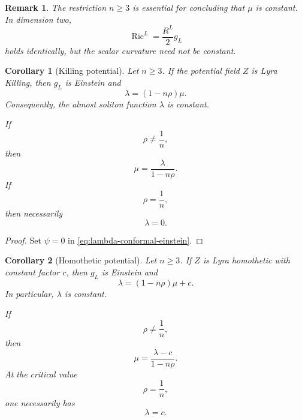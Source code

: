 \documentclass[a4paper,11pt]{article}
\theoremstyle{plain}
\newtheorem{corollary} {Corollary}[section]
\newtheorem{remark}{Remark}[section]
\numberwithin{equation}{section}
\begin{document}
\begin{remark}
	\label{rem:dimension-two-einstein}
	The restriction \(n\geq3\) is essential for concluding that
	\(\mu\) is constant. In dimension two,
	\[
	\operatorname{Ric}^{L}
	=
	\frac{R^{L}}{2}g_{L}
	\]
	holds identically, but the scalar curvature need not be
	constant.
\end{remark}

\begin{corollary}[Killing potential]
	\label{cor:killing-potential-einstein}
	Let \(n\geq3\). If the potential field \(Z\) is Lyra Killing,
	then \(g_{L}\) is Einstein and
	\begin{equation}
		\lambda
		=
		(1-n\rho)\mu.
		\label{eq:killing-soliton-relation}
	\end{equation}
	Consequently, the almost soliton function \(\lambda\) is
	constant.
	
	If
	\[
	\rho\neq\frac1n,
	\]
	then
	\begin{equation}
		\mu
		=
		\frac{\lambda}{1-n\rho}.
		\label{eq:killing-einstein-factor}
	\end{equation}
	If
	\[
	\rho=\frac1n,
	\]
	then necessarily
	\begin{equation}
		\lambda=0.
		\label{eq:critical-killing-lambda}
	\end{equation}
\end{corollary}

\begin{proof}
	Set \(\psi=0\) in
	\eqref{eq:lambda-conformal-einstein}.
\end{proof}

\begin{corollary}[Homothetic potential]
	\label{cor:homothetic-potential-einstein}
	Let \(n\geq3\). If \(Z\) is Lyra homothetic with constant factor
	\(c\), then \(g_{L}\) is Einstein and
	\begin{equation}
		\lambda
		=
		(1-n\rho)\mu+c.
		\label{eq:homothetic-soliton-relation}
	\end{equation}
	In particular, \(\lambda\) is constant.
	
	If
	\[
	\rho\neq\frac1n,
	\]
	then
	\begin{equation}
		\mu
		=
		\frac{\lambda-c}{1-n\rho}.
		\label{eq:homothetic-einstein-factor}
	\end{equation}
	At the critical value
	\[
	\rho=\frac1n,
	\]
	one necessarily has
	\begin{equation}
		\lambda=c.
		\label{eq:critical-homothetic-lambda}
	\end{equation}
\end{corollary}
\end{document}
